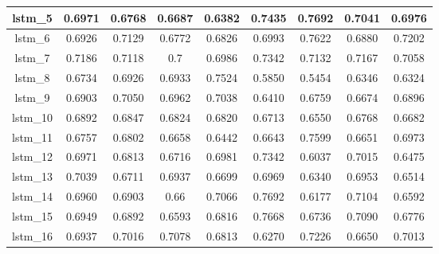 \begin{table}[p]
\begin{tabular}{|c|c|c|c|c|c|c|c|c|}
        lstm\_5  & 0.6971                        & 0.6768                         & 0.6687                      & 0.6382                  & 0.7435 & 0.7692 & 0.7041 & 0.6976 \\ \hline
        lstm\_6  & 0.6926                        & 0.7129                         & 0.6772                      & 0.6826                  & 0.6993 & 0.7622 & 0.6880 & 0.7202 \\ \hline
        lstm\_7  & 0.7186                        & 0.7118                         & 0.7                         & 0.6986                  & 0.7342 & 0.7132 & 0.7167 & 0.7058 \\ \hline
        lstm\_8  & 0.6734                        & 0.6926                         & 0.6933                      & 0.7524                  & 0.5850 & 0.5454 & 0.6346 & 0.6324 \\ \hline
        lstm\_9  & 0.6903                        & 0.7050                         & 0.6962                      & 0.7038                  & 0.6410 & 0.6759 & 0.6674 & 0.6896 \\ \hline
        lstm\_10 & 0.6892                        & 0.6847                         & 0.6824                      & 0.6820                  & 0.6713 & 0.6550 & 0.6768 & 0.6682 \\ \hline
        lstm\_11 & 0.6757                        & 0.6802                         & 0.6658                      & 0.6442                  & 0.6643 & 0.7599 & 0.6651 & 0.6973 \\ \hline
        lstm\_12 & 0.6971                        & 0.6813                         & 0.6716                      & 0.6981                  & 0.7342 & 0.6037 & 0.7015 & 0.6475 \\ \hline
        lstm\_13 & 0.7039                        & 0.6711                         & 0.6937                      & 0.6699                  & 0.6969 & 0.6340 & 0.6953 & 0.6514 \\ \hline
        lstm\_14 & 0.6960                        & 0.6903                         & 0.66                        & 0.7066                  & 0.7692 & 0.6177 & 0.7104 & 0.6592 \\ \hline
        lstm\_15 & 0.6949                        & 0.6892                         & 0.6593                      & 0.6816                  & 0.7668 & 0.6736 & 0.7090 & 0.6776 \\ \hline
        lstm\_16 & 0.6937                        & 0.7016                         & 0.7078                      & 0.6813                  & 0.6270 & 0.7226 & 0.6650 & 0.7013 \\ \hline

\end{tabular}
\end{table}
